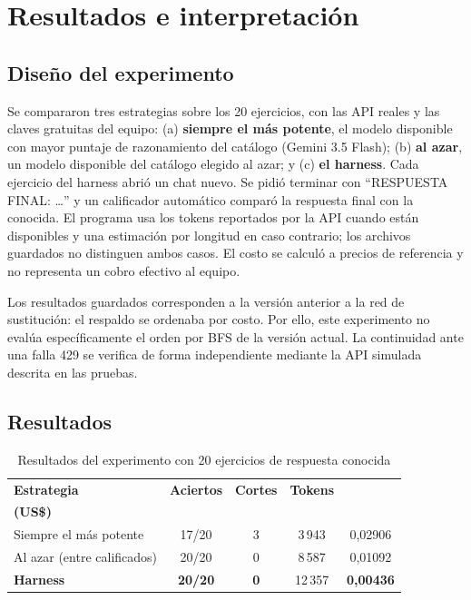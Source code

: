 \documentclass[12pt,letterpaper]{article}
\begin{document}
\section{Resultados e interpretación}\label{sec:resultados}

\subsection{Diseño del experimento}
Se compararon tres estrategias sobre los 20 ejercicios, con las API reales y las claves gratuitas del equipo: (a) \textbf{siempre el más potente}, el modelo disponible con mayor puntaje de razonamiento del catálogo (Gemini 3.5 Flash); (b) \textbf{al azar}, un modelo disponible del catálogo elegido al azar; y (c) \textbf{el harness}. Cada ejercicio del harness abrió un chat nuevo. Se pidió terminar con \enquote{RESPUESTA FINAL: \ldots} y un calificador automático comparó la respuesta final con la conocida. El programa usa los tokens reportados por la API cuando están disponibles y una estimación por longitud en caso contrario; los archivos guardados no distinguen ambos casos. El costo se calculó a precios de referencia y no representa un cobro efectivo al equipo.

Los resultados guardados corresponden a la versión anterior a la red de sustitución: el respaldo se ordenaba por costo. Por ello, este experimento no evalúa específicamente el orden por BFS de la versión actual. La continuidad ante una falla 429 se verifica de forma independiente mediante la API simulada descrita en las pruebas.

\subsection{Resultados}
\begin{table}[htbp]
\caption{Resultados del experimento con 20 ejercicios de respuesta conocida}\label{tab:resultados}
\small
\begin{tabularx}{\textwidth}{Xcccc}
\toprule
\textbf{Estrategia} & \textbf{Aciertos} & \textbf{Cortes} & \textbf{Tokens} & \shortstack{\textbf{Costo ref.}\\\textbf{(US\$)}} \\
\midrule
Siempre el más potente & 17/20 & 3 & 3\,943 & 0,02906 \\
Al azar (entre calificados) & 20/20 & 0 & 8\,587 & 0,01092 \\
\textbf{Harness} & \textbf{20/20} & \textbf{0} & 12\,357 & \textbf{0,00436} \\
\bottomrule
\end{tabularx}
\end{table}
\end{document}
